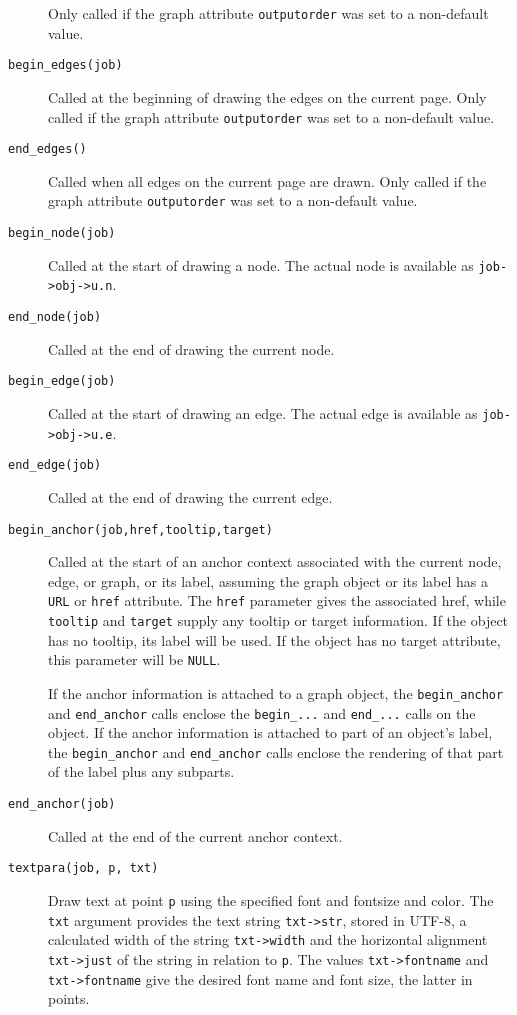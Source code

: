 \begin{description}
Only called if the graph attribute {\tt outputorder} was set to a non-default
value.
\item[{\tt begin\_edges(job)}]
Called at the beginning of drawing the edges on the current page.
Only called if the graph attribute {\tt outputorder} was set to a non-default
value.
\item[{\tt end\_edges()}]
Called when all edges on the current page are drawn.
Only called if the graph attribute {\tt outputorder} was set to a non-default
value.
\item[{\tt begin\_node(job)}]
Called at the start of drawing a node.
The actual node is available as {\tt job->obj->u.n}.
\item[{\tt end\_node(job)}]
Called at the end of drawing the current node.
\item[{\tt begin\_edge(job)}]
Called at the start of drawing an edge.
The actual edge is available as {\tt job->obj->u.e}.
\item[{\tt end\_edge(job)}]
Called at the end of drawing the current edge.
\item[{\tt begin\_anchor(job,href,tooltip,target)}]
Called at the start of an anchor context associated
with the current node, edge, or graph, or its label, assuming the graph
object or its label has a {\tt URL} or {\tt href} attribute. The
{\tt href} parameter gives the associated href, while
{\tt tooltip} and {\tt target} supply any tooltip or target information.
If the object has no tooltip, its label will be used. 
If the object has no target attribute, this parameter will be {\tt NULL}.

If the anchor information is attached to a graph object,
the {\tt begin\_anchor} and {\tt end\_anchor} calls 
enclose the {\tt begin\_...} and {\tt end\_...} calls on the object.
If the anchor information is attached to part of an object's label,
the {\tt begin\_anchor} and {\tt end\_anchor} calls 
enclose the rendering of that part of the label plus any subparts.
\item[{\tt end\_anchor(job)}]
Called at the end of the current anchor context.
\item[{\tt textpara(job, p, txt)}]
Draw text at point {\tt p} using the specified font and fontsize and color. 
The {\tt txt} argument provides the text string {\tt txt->str},
stored in UTF-8,
a calculated width of the string {\tt txt->width} and 
the horizontal alignment {\tt txt->just} of the string in relation to {\tt p}.
The values {\tt txt->fontname} and {\tt txt->fontname} give the desired
font name and font size, the latter in points.


\end{description}
